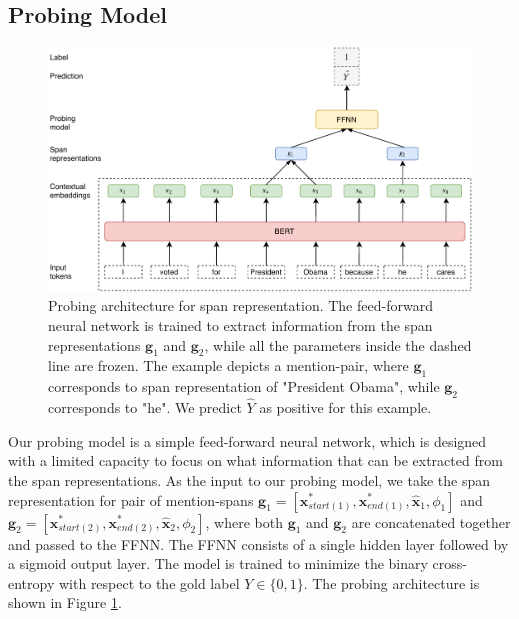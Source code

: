 \documentclass[11pt]{article}
\begin{document}
\subsection{Probing Model}
\begin{figure}[ht]
  \includegraphics[width=\textwidth]{probing_model}
  \caption{Probing architecture for span representation. The feed-forward neural network is trained to extract information from the span representations $\pmb{g}_{1}$ and $\pmb{g}_{2}$, while all the parameters inside the dashed line are frozen. The example depicts a mention-pair, where $\pmb{g}_{1}$ corresponds to span representation of "President Obama", while $\pmb{g}_{2}$ corresponds to "he". We predict $\hat{Y}$ as positive for this example.}
  \label{fig:probing_model}
\end{figure}

Our probing model is a simple feed-forward neural network, which is designed with a limited capacity to focus on what information that can be extracted from the span representations.
As the input to our probing model, we take the span representation for pair of mention-spans $\pmb{g}_{1} = [\pmb{x}_{start(1)}^{*}, \pmb{x}_{end(1)}^{*}, \hat{\pmb{x}}_{1}, \phi_{1}]$ and $\pmb{g}_{2} = [\pmb{x}_{start(2)}^{*}, \pmb{x}_{end(2)}^{*}, \hat{\pmb{x}}_{2}, \phi_{2}]$, where both $\pmb{g}_{1}$ and $\pmb{g}_{2}$ are concatenated together and passed to the FFNN. The FFNN consists of a single hidden layer followed by a sigmoid output layer. The model is trained to minimize the binary cross-entropy with respect to the gold label $Y \in \{0,1\}$. The probing architecture is shown in Figure \ref{fig:probing_model}.
\pagebreak
\end{document}
